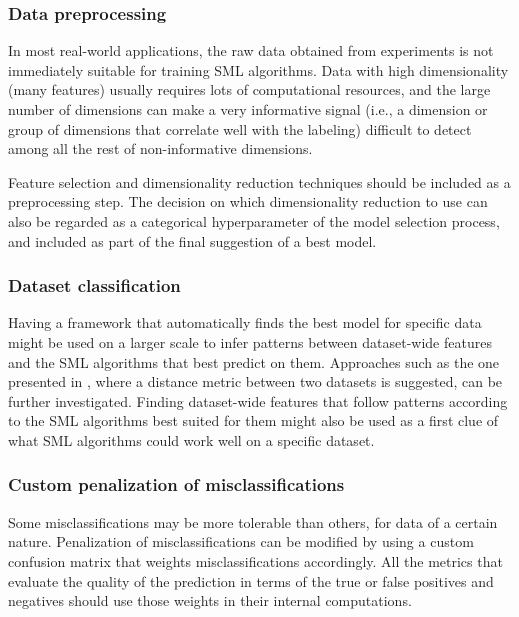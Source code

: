 	\subsubsection{Data preprocessing}
	In most real-world applications, the raw data obtained from experiments is not immediately suitable for
	training SML algorithms. Data with high dimensionality (many features) usually requires lots of
	computational resources, and the large number of dimensions can make a very informative signal (i.e., a
	dimension or group of dimensions that correlate well with the labeling) difficult to detect among
	all the rest of non-informative dimensions.
	
	Feature selection and dimensionality reduction techniques should be included as a preprocessing
	step. The decision on which dimensionality reduction to use can also be regarded as a
	categorical hyperparameter of the model selection process, and included as part of the final
	suggestion of a best model.

	\subsubsection{Dataset classification}
	Having a framework that automatically finds the best model for specific data might be used on a
	larger scale to infer patterns between dataset-wide features and the SML algorithms that best
	predict on them. Approaches such as the one presented in \cite{tatti2007distances}, where a
	distance metric between two datasets is suggested, can be further investigated. Finding
	dataset-wide features that follow patterns according to the SML algorithms best suited for them
	might also be used as a first clue of what SML algorithms could work well on a specific dataset.



	\subsubsection{Custom penalization of misclassifications}
	Some misclassifications may be more tolerable than others, for data of a certain nature.
	Penalization of misclassifications can be modified by using a custom confusion matrix that
	weights misclassifications accordingly. All the metrics that evaluate the quality of the
	prediction in terms of the true or false positives and negatives should use those weights in
	their internal computations.

